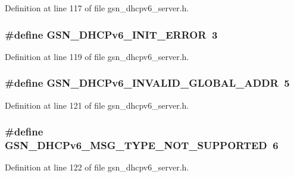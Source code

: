 Definition at line 117 of file gsn\_\-dhcpv6\_\-server.h.

\hypertarget{a00483_a464da6d56a014f1b62a5a90824a1703a}{
\subsubsection[{GSN\_\-DHCPv6\_\-INIT\_\-ERROR}]{\setlength{\rightskip}{0pt plus 5cm}\#define GSN\_\-DHCPv6\_\-INIT\_\-ERROR~3}}
\label{a00483_a464da6d56a014f1b62a5a90824a1703a}


Definition at line 119 of file gsn\_\-dhcpv6\_\-server.h.

\hypertarget{a00483_ad8ed41acfd9ed0e8a154bee5a02ad21e}{
\subsubsection[{GSN\_\-DHCPv6\_\-INVALID\_\-GLOBAL\_\-ADDR}]{\setlength{\rightskip}{0pt plus 5cm}\#define GSN\_\-DHCPv6\_\-INVALID\_\-GLOBAL\_\-ADDR~5}}
\label{a00483_ad8ed41acfd9ed0e8a154bee5a02ad21e}


Definition at line 121 of file gsn\_\-dhcpv6\_\-server.h.

\hypertarget{a00483_a404520803dd797f133b20938b0526f90}{
\subsubsection[{GSN\_\-DHCPv6\_\-MSG\_\-TYPE\_\-NOT\_\-SUPPORTED}]{\setlength{\rightskip}{0pt plus 5cm}\#define GSN\_\-DHCPv6\_\-MSG\_\-TYPE\_\-NOT\_\-SUPPORTED~6}}
\label{a00483_a404520803dd797f133b20938b0526f90}


Definition at line 122 of file gsn\_\-dhcpv6\_\-server.h.

